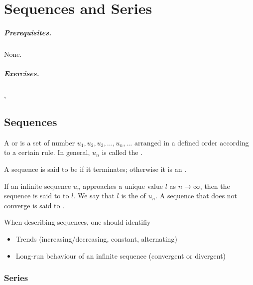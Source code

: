 \chapter{Sequences and Series}\label{sec:Sequences-and-Series}

\paragraph{Prerequisites.} None.
\paragraph{Exercises.} , 

\section{Sequences}

\begin{definition}
    A  or  is a set of number $u_1, u_2, u_3, \dots, u_n, \dots$ arranged in a defined order according to a certain rule. In general, $u_n$ is called the .
\end{definition}

\begin{definition}
    A sequence is said to be  if it terminates; otherwise it is an .
\end{definition}

\begin{definition}
    If an infinite sequence $u_n$ approaches a unique value $l$ as $n \to \infty$, then the sequence is said to  to $l$. We say that $l$ is the  of $u_n$. A sequence that does not converge is said to .
\end{definition}

When describing sequences, one should identifiy
\begin{itemize}
    \item Trends (increasing/decreasing, constant, alternating)
    \item Long-run behaviour of an infinite sequence (convergent or divergent)
\end{itemize}

\subsection{Series}

